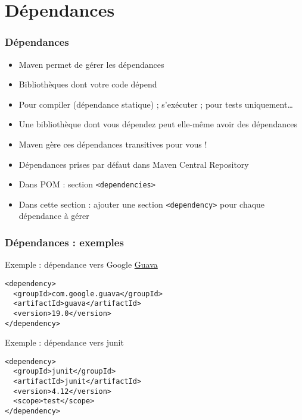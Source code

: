 \documentclass[english, french]{beamer}
\begin{document}
\section{Dépendances}
\begin{frame}
	\frametitle{Dépendances}
	\begin{itemize}
		\item Maven permet de gérer les \og{}dépendances\fg{}
		\item Bibliothèques dont votre code dépend
		\item Pour compiler (dépendance statique) ; s’exécuter ; pour tests uniquement…
		\item Une bibliothèque dont vous dépendez peut elle-même avoir des dépendances
		\item Maven gère ces dépendances transitives pour vous !
		\item Dépendances prises {\tiny par défaut} dans Maven Central Repository
		\item Dans POM : section \texttt{<dependencies>}
		\item Dans cette section : ajouter une section \texttt{<dependency>} pour chaque dépendance à gérer
	\end{itemize}
\end{frame}

\begin{frame}[fragile]
	\frametitle{Dépendances : exemples}
	\begin{block}{Exemple : dépendance vers Google \href{https://github.com/google/guava/blob/master/README.md}{Guava}}
		\begin{lstlisting}
<dependency>
  <groupId>com.google.guava</groupId>
  <artifactId>guava</artifactId>
  <version>19.0</version>
</dependency>
		\end{lstlisting}	
	\end{block}
	\begin{block}{Exemple : dépendance vers junit}
		\begin{lstlisting}
<dependency>
  <groupId>junit</groupId>
  <artifactId>junit</artifactId>
  <version>4.12</version>
  <scope>test</scope>
</dependency>
		\end{lstlisting}	
	\end{block}
\end{frame}
\end{document}

